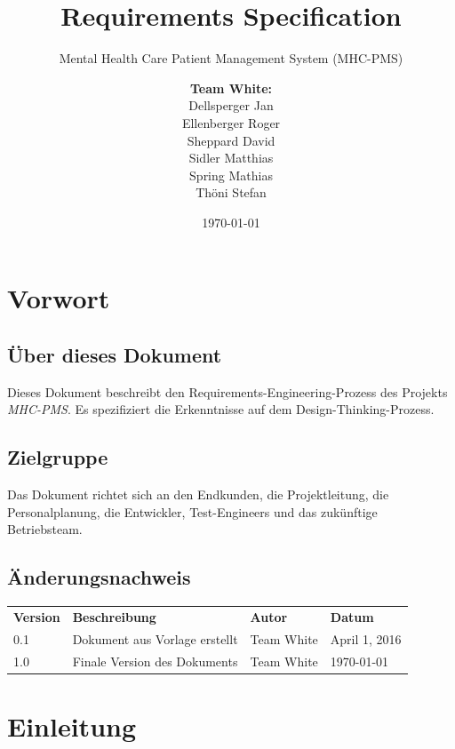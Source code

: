 \documentclass[a4paper]{scrreprt}
\title{Requirements Specification}
\subtitle{Mental Health Care Patient Management System (MHC-PMS)}
\author{
\begin{tabular}{l}
\normalfont\bfseries{Team White:}\\
Dellsperger Jan\\
Ellenberger Roger\\
Sheppard David\\
Sidler Matthias\\
Spring Mathias\\
Thöni Stefan
\end{tabular}
}
\date{\today}
\begin{document}
\begin{titlepage}
	\maketitle
\end{titlepage}


\tableofcontents


\chapter{Vorwort}


\section{Über dieses Dokument}
Dieses Dokument beschreibt den Requirements-Engineering-Prozess des Projekts \textit{MHC-PMS}. Es spezifiziert die Erkenntnisse auf dem Design-Thinking-Prozess.


\section{Zielgruppe}
Das Dokument richtet sich an den Endkunden, die Projektleitung, die Personalplanung, die Entwickler, Test-Engineers und das zukünftige Betriebsteam.


\section{Änderungsnachweis}
\begin{table}[h]
\label{tab_version-history}
\begin{tabular}{llll}
{\bf Version} & {\bf Beschreibung} 							& {\bf Autor} 	& {\bf Datum} \\
0.1         & Dokument aus Vorlage erstellt 				& Team White 		& April 1, 2016  \\
1.0         & Finale Version des Dokuments					& Team White 		& \today  \\



\end{tabular}
\end{table}



\chapter{Einleitung}
\end{document}
